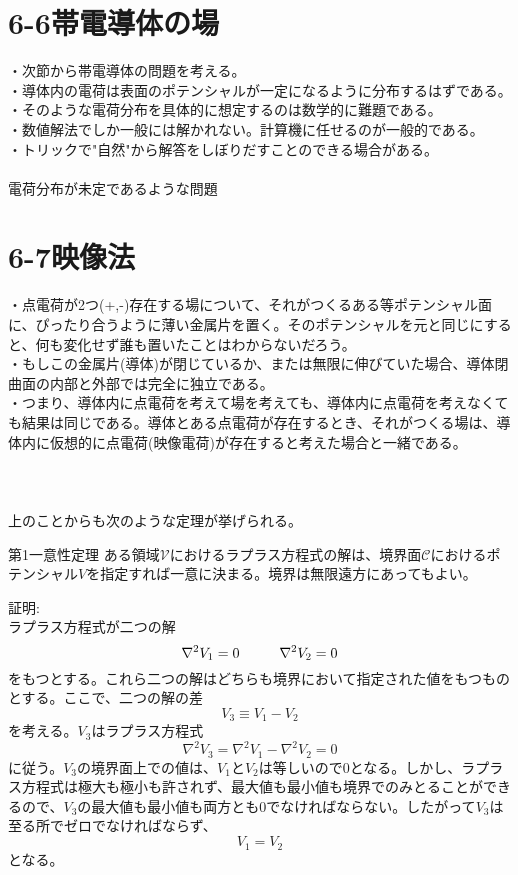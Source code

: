 \documentclass{jsarticle}
\begin{document}
\newpage
\section*{6-6\hspace{5mm}帯電導体の場}
\noindent
・次節から帯電導体の問題を考える。\\
・導体内の電荷は表面のポテンシャルが一定になるように分布するはずである。\\
・そのような電荷分布を具体的に想定するのは数学的に難題である。\\
・数値解法でしか一般には解かれない。計算機に任せるのが一般的である。\\
・トリックで"自然"から解答をしぼりだすことのできる場合がある。\\
\\

電荷分布が未定であるような問題

\newpage
\section*{6-7\hspace{5mm}映像法}
\noindent
・点電荷が2つ(+,-)存在する場について、それがつくるある等ポテンシャル面に、ぴったり合うように薄い金属片を置く。そのポテンシャルを元と同じにすると、何も変化せず誰も置いたことはわからないだろう。\\
・もしこの金属片(導体)が閉じているか、または無限に伸びていた場合、導体閉曲面の内部と外部では完全に独立である。\\
・つまり、導体内に点電荷を考えて場を考えても、導体内に点電荷を考えなくても結果は同じである。導体とある点電荷が存在するとき、それがつくる場は、導体内に仮想的に点電荷(映像電荷)が存在すると考えた場合と一緒である。
\\
\\
\\
\\
上のことからも次のような定理が挙げられる。
\begin{itembox}[l]{第1一意性定理}
ある領域\(\mathcal{V}\)におけるラプラス方程式の解は、境界面\(\mathcal{C}\)におけるポテンシャル\(V\)を指定すれば一意に決まる。境界は無限遠方にあってもよい。
\end{itembox}
証明:\\
ラプラス方程式が二つの解
\[\nabla^{2}V_{1}=0\hspace{10mm}\nabla^{2}V_{2}=0\]
をもつとする。これら二つの解はどちらも境界において指定された値をもつものとする。ここで、二つの解の差
\[V_{3}\equiv V_{1}-V_{2}\]
を考える。\(V_{3}\)はラプラス方程式
\[\nabla^{2}V_{3}=\nabla^{2}V_{1}-\nabla^{2}V_{2}=0\]
に従う。\(V_{3}\)の境界面上での値は、\(V_{1}とV_{2}\)は等しいので0となる。しかし、ラプラス方程式は極大も極小も許されず、最大値も最小値も境界でのみとることができるので、\(V_{3}\)の最大値も最小値も両方とも0でなければならない。したがって\(V_{3}\)は至る所でゼロでなければならず、
\[V_{1}=V_{2}\]
となる。\\
\\
\end{document}
